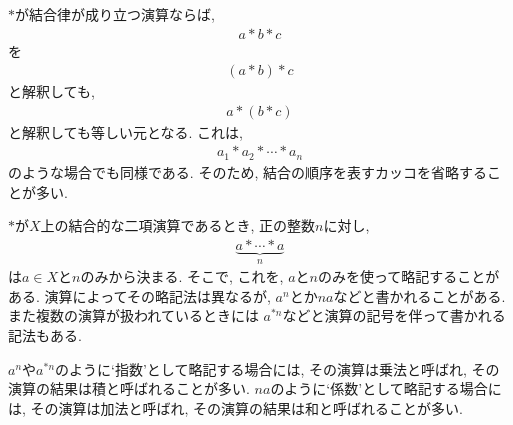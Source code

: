 \begin{remark}
  $\ast$が結合律が成り立つ演算ならば,
  \begin{align*}
    a\ast b \ast c
  \end{align*}
  を
  \begin{align*}
    (a\ast b) \ast c
  \end{align*}
  と解釈しても,
  \begin{align*}
    a\ast (b \ast c)
  \end{align*}
  と解釈しても等しい元となる.
  これは,
  \begin{align*}
    a_1\ast a_2 \ast \cdots \ast a_n
  \end{align*}
  のような場合でも同様である.
  そのため,
  結合の順序を表すカッコを省略することが多い.
\end{remark}
\begin{remark}
  $\ast$が$X$上の結合的な二項演算であるとき,
  正の整数$n$に対し,
  \begin{align*}
    \underbrace{a\ast \cdots \ast a}_{n}
  \end{align*}
  は$a\in X$と$n$のみから決まる.
  そこで, これを, $a$と$n$のみを使って略記することがある.
  演算によってその略記法は異なるが,
  $a^n$とか$na$などと書かれることがある.
  また複数の演算が扱われているときには
  $a^{\ast n}$などと演算の記号を伴って書かれる記法もある.
  
  $a^n$や$a^{\ast n}$のように`指数'として略記する場合には,
  その演算は乗法と呼ばれ, その演算の結果は積と呼ばれることが多い.
  $na$のように`係数'として略記する場合には,
  その演算は加法と呼ばれ, その演算の結果は和と呼ばれることが多い.
\end{remark}

